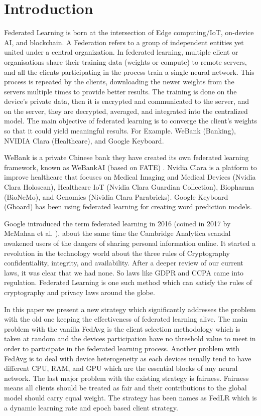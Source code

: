 \documentclass[conference]{IEEEtran}
\begin{document}
\section{Introduction}
Federated Learning is born at the intersection of Edge computing/IoT, on-device AI, and blockchain.  A Federation refers to a group of independent entities yet united under a central organization. In federated learning, multiple client or organisations share their training data (weights or compute) to remote servers, and all the clients participating in the process train a single neural network. This process is repeated by the clients, downloading the newer weights from the servers multiple times to provide better results. The training is done on the device's private data, then it is encrypted and communicated to the server, and on the server, they are decrypted, averaged, and integrated into
the centralized model. The main objective of federated learning is to converge the client's weights so that it could yield meaningful results. For Example. WeBank (Banking), NVIDIA Clara
(Healthcare), and Google Keyboard.\par
WeBank is a private Chinese bank they have created its own federated learning framework, known as WeBankAI (based on FATE) \cite{liu2021fate}. Nvidia Clara \cite{nvidia} is a platform to improve healthcare that focuses on \cite{liu2021fate} Medical Imaging and Medical Devices (Nvidia Clara Holoscan), Healthcare IoT (Nvidia Clara Guardian Collection), Biopharma (BioNeMo), and Genomics (Nividia Clara Parabricks). Google Keyboard (Gboard) \cite{yang2018applied} has been using federated learning for creating word prediction models.\par
Google introduced the term federated learning in 2016 (coined in 2017 by McMahan et al. \cite{mcmahan2017communication}), about the same time the Cambridge Analytica scandal awakened users of the dangers of sharing personal information online. It started a revolution in the technology world about the three rules of Cryptography confidentiality, integrity, and availability. After a deeper review of our current laws, it was clear that we had none. So laws like GDPR and CCPA came into regulation. Federated Learning is one such method which can satisfy the rules of cryptography and privacy laws around the globe.\par 
 In this paper we present a new strategy which significantly addresses the problem with the old one keeping the effectiveness of federated learning alive. The main problem with the vanilla FedAvg is the client selection methodology which is taken at random and the devices participation have no threshold value to meet in order to participate in the federated learning process. Another problem with FedAvg is to deal with device heterogeneity as each devices usually tend to have different CPU, RAM, and GPU which are the essential blocks of any neural network. The last major problem with the existing strategy is fairness. Fairness means all clients should be treated as fair and their contributions to the global model should carry equal weight. The strategy has been names as FedLR which is a dynamic learning rate and epoch based client strategy.
 
\end{document}
